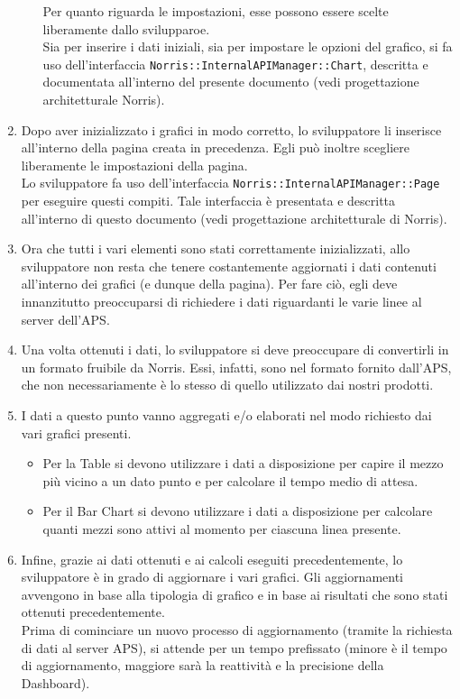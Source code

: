 \begin{enumerate}
\begin{itemize}
                Per quanto riguarda le impostazioni, esse possono essere scelte liberamente dallo svilupparoe.\\
                Sia per inserire i dati iniziali, sia per impostare le opzioni del grafico, si fa uso dell'interfaccia \texttt{Norris::InternalAPIManager::Chart}, descritta e documentata all'interno del presente documento (vedi progettazione architetturale Norris).
            \end{itemize}
            \item Dopo aver inizializzato i grafici in modo corretto, lo sviluppatore li inserisce all'interno della pagina creata in precedenza. Egli può inoltre scegliere liberamente le impostazioni della pagina.\\
            Lo sviluppatore fa uso dell'interfaccia \texttt{Norris::InternalAPIManager::Page} per eseguire questi compiti. Tale interfaccia è presentata e descritta all'interno di questo documento (vedi progettazione architetturale di Norris).
            \item Ora che tutti i vari elementi sono stati correttamente inizializzati, allo sviluppatore non resta che tenere costantemente aggiornati i dati contenuti all'interno dei grafici (e dunque della pagina). Per fare ciò, egli deve innanzitutto preoccuparsi di richiedere i dati riguardanti le varie linee al server dell'APS.
            \item Una volta ottenuti i dati, lo sviluppatore si deve preoccupare di convertirli in un formato fruibile da Norris. Essi, infatti, sono nel formato fornito dall'APS, che non necessariamente è lo stesso di quello utilizzato dai nostri prodotti.
            \item I dati a questo punto vanno aggregati e/o elaborati nel modo richiesto dai vari grafici presenti.
            \begin{itemize}
                \item Per la Table si devono utilizzare i dati a disposizione per capire il mezzo più vicino a un dato punto e per calcolare il tempo medio di attesa.
                \item Per il Bar Chart si devono utilizzare i dati a disposizione per calcolare quanti mezzi sono attivi al momento per ciascuna linea presente.
            \end{itemize}
            \item Infine, grazie ai dati ottenuti e ai calcoli eseguiti precedentemente, lo sviluppatore è in grado di aggiornare i vari grafici. Gli aggiornamenti avvengono in base alla tipologia di grafico e in base ai risultati che sono stati ottenuti precedentemente.\\
            Prima di cominciare un nuovo processo di aggiornamento (tramite la richiesta di dati al server APS), si attende per un tempo prefissato (minore è il tempo di aggiornamento, maggiore sarà la reattività e la precisione della Dashboard).
        \end{enumerate}